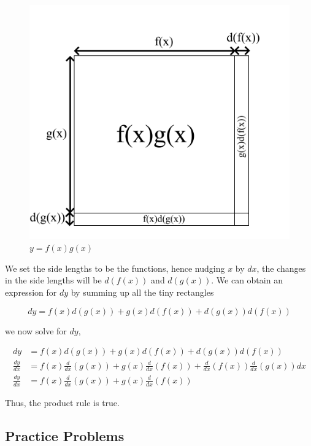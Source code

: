 \documentclass[a4paper,12pt,oneside]{book}
\begin{document}
\begin{figure}[H]
    \begin{center}
        \includegraphics[scale=0.35]{img/zayan/prodrule.png}
        \caption{$y=f(x)g(x)$}
        \label{fig:prodrule}
    \end{center}
\end{figure}

\noindent We set the side lengths to be the functions, hence nudging $x$ by $dx$, the changes in the side lengths will be $d(f(x))$ and $d(g(x))$. We can obtain an expression for $dy$ by summing up all the tiny rectangles

$$dy=f(x)d(g(x))+g(x)d(f(x))+d(g(x))d(f(x))$$

\noindent we now solve for $dy$,

$$\begin{aligned}
dy&=f(x)d(g(x))+g(x)d(f(x))+d(g(x))d(f(x))\\
\frac{dy}{dx}&=f(x)\frac{d}{dx}(g(x))+g(x)\frac{d}{dx}(f(x))+\frac{d}{dx}(f(x))\frac{d}{dx}(g(x))dx\\
\frac{dy}{dx}&=f(x)\frac{d}{dx}(g(x))+g(x)\frac{d}{dx}(f(x))
\end{aligned}$$

\noindent Thus, the product rule is true.

\subsection{Practice Problems}
\end{document}
